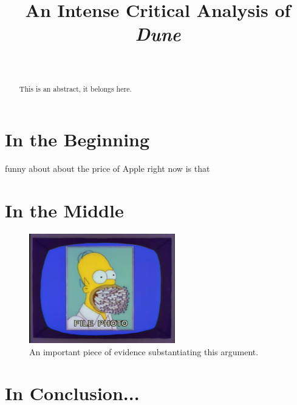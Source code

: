 \documentclass[10pt,journal,letterpaper,final]{IEEEtran}
\begin{document}
\title{An Intense Critical Analysis of \textit{Dune}}

\author{
	 \\
}

\maketitle

\begin{abstract}
This is an abstract, it belongs here. \lipsum[1]
\end{abstract}

\section{In the Beginning}

 funny about about the price of Apple \cite{black-scholes} right now \cite{didion} is that \lipsum[2]

\section{In the Middle}

\lipsum[3]

\begin{figure}
\centering
\includegraphics[width=2.5in]{figure_1}
\caption{An important piece of evidence substantiating this argument.}
\label{figure_1}
\end{figure}

\section{In Conclusion...}

\lipsum[4]


\printbibliography

\end{document}
